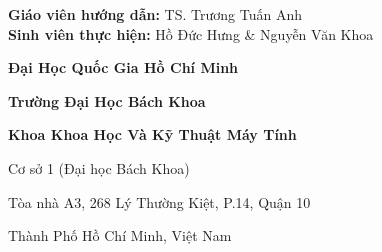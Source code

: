 \thispagestyle{empty} %
\noindent

\large
\vspace*{\fill}
\hspace{-0.52cm}\textbf{Giáo viên hướng dẫn:} TS. Trương Tuấn Anh\\
\textbf{Sinh viên thực hiện:} Hồ Đức Hưng \& Nguyễn Văn Khoa
\vspace{5cm}

\small
\hspace*{\fill}\textbf{Đại Học Quốc Gia Hồ Chí Minh}

\hspace*{\fill}\textbf{Trường Đại Học Bách Khoa}

\hspace*{\fill}\textbf{Khoa Khoa Học Và Kỹ Thuật Máy Tính}

\hspace*{\fill}Cơ sở 1 (Đại học Bách Khoa)

\hspace*{\fill}Tòa nhà A3, 268 Lý Thường Kiệt, P.14, Quận 10

\hspace*{\fill} Thành Phố Hồ Chí Minh, Việt Nam


\normalsize
\normalfont
\vspace*{2cm}